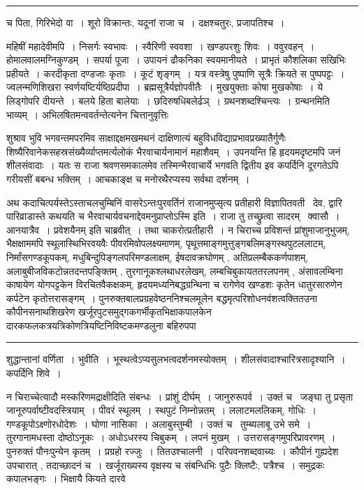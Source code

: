 \documentclass[11pt, openany]{book}
\begin{document}
\vspace{2mm}
\hrule

\noindent
{\s च पिता, गिरिभेदो वा~। शूरो विक्रान्तः, यदूनां राजा च~। दक्षश्चतुरः, प्रजापतिश्च~।

महिषीं महादेवीमपि~। निसर्गः स्वभावः~। स्वैरिणी स्ववशा~। खण्डपरशुः शिवः~। ववुरवहन्~। होमालवालमग्निकुण्डम्~। सपर्या पूजा~। उपायनं ढौकनिका स्वयमानीयते~। प्राभृतं कौशलिका सखिभिः प्रहीयते~। करदीकृता दण्डजाः कृताः~। कूटं शृङ्गम्~। यत्र वस्त्रेषु पुष्पाणि सूत्रैः क्रियते स पुष्पपट्टः~। ज्वलन्मणिशिखरा स्वर्णयष्टिर्यष्ठिप्रदीपा~। ब्रह्मसूत्रैर्यज्ञोपवीतैः~। मुखयुक्ताः कोषा मुखकोषाः~। ये लिड्गोपरि दीयन्ते~। बलये हिता बालेयाः~। {\qt छदिरुषधिबलेर्ढञ्}~। ग्रथनशब्दश्चिन्त्यः~। ग्रन्थनमिति भाव्यम्~। अभिलषितमन्ववर्तन्तेत्यनेन चित्तानुवृत्तिः}

\newpage

\noindent
शुश्राव भुवि भगवन्तमपरमिव साक्षाद्दक्षमखमथनं दाक्षिणात्यं बहुविधविद्याप्रभावप्रख्यातैर्गुणैः शिष्यैरिवानेकसहस्रसंख्यैर्व्याप्तमर्त्यलोकं भैरवाचार्यनामानं महाशैवम्~। उपनयन्ति हि हृदयमदृष्टमपि जनं शीलसंवादाः~। यतः स राजा श्रवणसमकालमेव तस्मिन्भैरवाचार्ये भगवति द्वितीय इव कपर्दिनि दूरगतेऽपि गरीयसीं बबन्ध भक्तिम्~। आचकाङ्क्ष च मनोरथैरप्यस्य सर्वथा दर्शनम्~।

अथ कदाचित्पर्यस्तेऽस्ताचलचुम्बिनिं वासरेऽन्तःपुरवर्तिनं राजानमुप्सृत्य प्रतीहारी विज्ञापितवती \textendash\ {\haq देव, द्वारि पारिव्राडास्ते कथयति च भैरवाचार्यवचनाद्देवमनुप्राप्तोऽस्मि} इति~। राजा तु तच्छ्रुत्वा सादरम् \textendash\ {\haq क्वासौ~। आनयात्रैव~। प्रवेशयैनम्} इति चाब्रवीत्~। तथा चाकरोत्प्रतीहारी~। न चिराच्च प्रविशन्तं प्रांशुमाजानुभुजम्, भैक्षक्षाममपि स्थूलास्थिभिरवयवैः पीवरमिवोपलक्ष्यमाणम्, पृथूत्तमाङ्गमुत्तुङ्गबलिमङ्गस्थपुटललाटम्, निर्मांसगण्डकूपकम्, मधुबिन्दुपिङ्गलपरिमण्डलाक्षम्, ईषदावक्रघोणम् , अतिप्रलम्बैककर्णपाशम्, अलाबुबीजविकटोन्नतदन्तपङ्क्तिम् , तुरगानूकश्लथाधरलेखम्, लम्बचिबुकायततरलपनम् , अंसावलम्बिना काषायेण योगपट्टकेन विरचितवैकक्षकम्, हृदयमध्यनिबद्धग्रन्थिना च रागेणेव खण्डशः कृतेन धातुरसारुणेन कर्पटेन कृतोत्तरासङ्गम्~। पुनरुक्तबालप्रग्रहवेष्ठननिश्चलमूलेन बद्धमृत्परिशोधनवंशत्वक्तितउना कौपीनसनाथशिखरेण खर्जूरपुटसमुद्गकगर्भीकृतभिक्षाकपालकेन दारकफलकत्रयत्रिकोणत्रियष्टिनिविष्टकमण्डलुना बहिरुपपा\textendash

\vspace{2mm}
\hrule

\noindent
{\s शुद्धान्तानां वर्णिता~। {\qtt भुवीति}~। भूस्थत्वेऽप्यसुलभत्वदर्शनमस्योक्तम्~। शीलसंवादाश्चारित्रसादृश्यानि~। कपर्दिनि शिवे~।

न चिराच्चेत्यादौ मस्करिणमद्राक्षीदिति संबन्धः~। प्रांशुं दीर्घम्~। जानुरुरूपर्व~। उक्तं च \textendash\ {\qt जङ्घा तु प्रसृता जानूरुपर्वाष्टीवदस्त्रियाम्}~। पीवरं स्थूलम्~। स्थपुटं निम्नोन्नतम्~। ललाटमललिकम्, गोधिः~। गण्डकूपोऽक्ष्णोरधोदेशः~। घोणा नासिका~। अलाबुस्तुम्बी~। उक्तं च \textendash\ {\qt तुम्ब्यलाबू उभे समे}~। तुरगानामधस्ता दोष्ठोऽनूकः~। {\qt अधोऽधरस्य चिबुकम्}~। लपनं मुखम्~। उत्तरासङ्गमुपरिप्रावरणम्~। पुनरुक्तं पौनःपुन्येन कृतम्~। प्रग्रहो रज्जुः~। तितउश्चालनी~। परिपवनशब्दवाच्यः~। कौपीनं गुह्यदेश उपचारात् , तदाच्छादनं च~। खर्जूराख्यस्य वृक्षस्य च संबन्धिभिः पुटैः क्लिष्टैः, पत्रैश्च~। समुद्रकः कपालभङ्गः~। भिक्षायै कियते दारवे }
\end{document}

